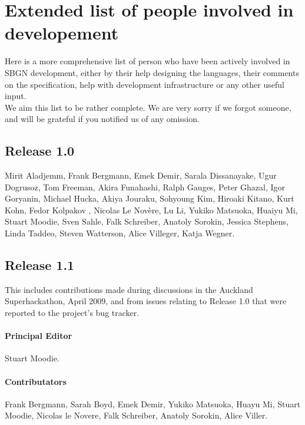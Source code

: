 \chapter{Extended list of people involved in \SBGNPDLone developement}\label{sec:acknowledgments}

Here is a more comprehensive list of person who have been actively involved in SBGN development, either by their help designing the languages, their comments on the specification, help with development infrastructure or any other useful input.\\[\baselineskip]

 We aim this list to be rather complete. We are very sorry if we forgot someone, and will be grateful if you notified us of any omission.

\section{Release 1.0}

Mirit Aladjemm, Frank Bergmann, Emek Demir, Sarala Dissanayake, Ugur Dogrusoz, Tom Freeman, Akira Funahashi, Ralph Gauges, Peter Ghazal, Igor Goryanin, Michael Hucka, Akiya Jouraku, Sohyoung Kim, Hiroaki Kitano, Kurt Kohn, Fedor Kolpakov , Nicolas Le Nov\`{e}re, Lu Li, Yukiko Matsuoka, Huaiyu Mi, Stuart Moodie, Sven Sahle, Falk Schreiber, Anatoly Sorokin, Jessica Stephens, Linda Taddeo, Steven Watterson, Alice Villeger, Katja Wegner.\\[\baselineskip]

\section{Release 1.1}

This includes contributions made during discussions in the Auckland Superhackathon, April 2009, and from issues relating to Release 1.0 that were reported to the project's bug tracker.

\subsubsection*{Principal Editor}

Stuart Moodie.

\subsubsection*{Contributators}

Frank Bergmann, Sarah Boyd, Emek Demir, Yukiko Matsuoka, Huayu Mi, Stuart Moodie, Nicolas le Novere, Falk Schreiber, Anatoly Sorokin, Alice Viller.

